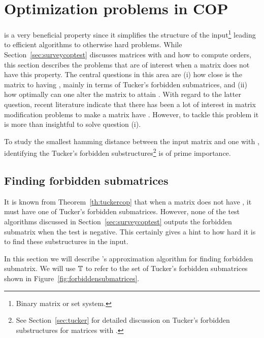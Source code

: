 
\section{Optimization problems in COP}
\label{sec:surveycopopt}

\COP is a very beneficial property since it simplifies the structure
of the input\footnote{Binary matrix or set system.} leading to
efficient algorithms to otherwise hard problems.  While
Section~\ref{sec:surveycoptest} discusses matrices with \COP and how
to compute \COP orders, this section describes the problems that are
of interest when a matrix does not have this property.  The central
questions in this area are (i) how close is the matrix to having \COP,
mainly in terms of Tucker's forbidden submatrices, and (ii) how
optimally can one alter the matrix to attain \COP.  With regard to the
latter question, recent literature indicate that there has been a lot
of interest in matrix modification problems to make a matrix have \COP
\cite{hg02, tz07}. However, to tackle this problem it is more than
insightful to solve question (i).

To study the smallest hamming distance  between the
input matrix and one with \COP, identifying the Tucker's forbidden
substructures\footnote{See Section~\ref{sec:tucker} for detailed
  discussion on Tucker's forbidden substructures for matrices with
  \COP.} is of prime importance. 

\subsection{Finding forbidden submatrices}
It is known from Theorem~\ref{th:tuckercop}
that when a matrix does not have \COP, it must have one of Tucker's
forbidden submatrices. However, none of the \COP test algorithms discussed in
Section~\ref{sec:surveycoptest} outputs the forbidden submatrix when
the test is negative. This certainly gives a hint to how hard it is to find
these substructures in the input. 

In this section we will describe \cite{d08phd}'s approximation
algorithm for finding forbidden submatrix. We will use $\mathbb{T}$ to
refer to the set of Tucker's forbidden submatrices shown in
Figure~\ref{fig:forbiddensubmatrices}.


